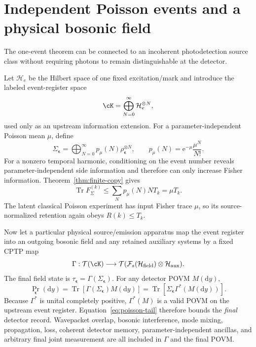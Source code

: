 \documentclass[aps,pra,reprint,amsmath,amssymb,longbibliography]{revtex4-2}
\newcommand{\Tr}{\operatorname{Tr}}
\newcommand{\dd}{\mathrm{d}}
\newcommand{\e}{\mathrm{e}}
\newcommand{\cH}{\mathcal{H}}
\newcommand{\cF}{\mathcal{F}}
\begin{document}
\section{Independent Poisson events and a physical bosonic field}
\label{sec:poisson-field}

The one-event theorem can be connected to an incoherent photodetection source class without requiring photons to remain distinguishable at the detector.

Let $\cH_e$ be the Hilbert space of one fixed excitation/mark and introduce the labeled event-register space
\begin{equation}
 \cK=\bigoplus_{N=0}^\infty \cH_e^{\otimes N},
\end{equation}
used only as an upstream information extension.  For a parameter-independent Poisson mean $\mu$, define
\begin{equation}
 \Sigma_{\bm\epsilon}
 =\bigoplus_{N=0}^\infty p_\mu(N)\rho_{\bm\epsilon}^{\otimes N},
 \qquad
 p_\mu(N)=\e^{-\mu}\frac{\mu^N}{N!}.
 \label{eq:compound-state}
\end{equation}
For a nonzero temporal harmonic, conditioning on the event number reveals parameter-independent side information and therefore can only increase Fisher information.  Theorem~\ref{thm:finite-copy} gives
\begin{equation}
 \Tr F_{\Sigma}^{(k)}
 \leq\sum_Np_\mu(N)NT_k
 =\mu T_k.
 \label{eq:poisson-tail}
\end{equation}
The latent classical Poisson experiment has input Fisher trace $\mu$, so its source-normalized retention again obeys $R(k)\leq T_k$.

Now let a particular physical source/emission apparatus map the event register into an outgoing bosonic field and any retained auxiliary systems by a fixed CPTP map
\begin{equation}
 \Gamma:\mathcal T(\cK)\longrightarrow
 \mathcal T(\cF_s(\cH_{\rm field})\otimes\cH_{\rm aux}).
 \label{eq:Gamma}
\end{equation}
The final field state is $\tau_{\bm\epsilon}=\Gamma(\Sigma_{\bm\epsilon})$.  For any detector POVM $M(\dd y)$,
\begin{equation}
 \Pr_{\bm\epsilon}(\dd y)
 =\Tr[\Gamma(\Sigma_{\bm\epsilon})M(\dd y)]
 =\Tr[\Sigma_{\bm\epsilon}\Gamma^*(M(\dd y))].
 \label{eq:pullback}
\end{equation}
Because $\Gamma^*$ is unital completely positive, $\Gamma^*(M)$ is a valid POVM on the upstream event register.  Equation~\eqref{eq:poisson-tail} therefore bounds the \emph{final} detector record.  Wavepacket overlap, bosonic interference, mode mixing, propagation, loss, coherent detector memory, parameter-independent ancillas, and arbitrary final joint measurement are all included in $\Gamma$ and the final POVM.
\end{document}
